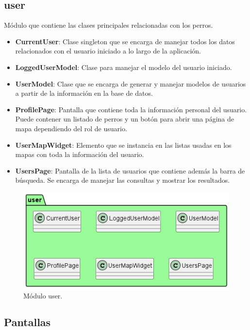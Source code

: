 \documentclass[a4paper, 12pt]{article}
\begin{document}
\subsection*{user}

Módulo que contiene las clases principales relacionadas con los perros.

\begin{itemize}[noitemsep]
	\item \textbf{CurrentUser}: Clase singleton que se encarga de manejar todos los datos relacionados con el usuario iniciado a lo largo de la aplicación.
	\item \textbf{LoggedUserModel}: Clase para manejar el modelo del usuario iniciado.
	\item \textbf{UserModel}: Clase que se encarga de generar y manejar modelos de usuarios a partir de la información en la base de datos. 
	\item \textbf{ProfilePage}:  Pantalla que contiene toda la información personal del usuario. Puede contener un listado de perros y un botón para abrir una página de mapa dependiendo del rol de usuario.
	\item \textbf{UserMapWidget}: Elemento que se instancia en las listas usadas en los mapas con toda la información del usuario.
	\item \textbf{UsersPage}: Pantalla de la lista de usuarios que contiene además la barra de búsqueda. Se encarga de manejar las consultas y mostrar los resultados.
\end{itemize}

\begin{figure}[H]
	\begin{center}
		{\includegraphics[width=0.8\linewidth]{diagram/User.png}\par}
		\caption{Módulo user.}
	\end{center}
\end{figure}


\subsection{Pantallas}
\end{document}
